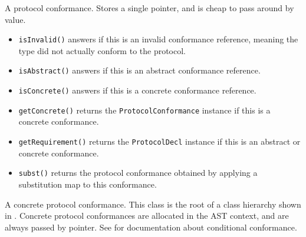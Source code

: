 \documentclass[../generics]{subfiles}
\begin{document}
A protocol conformance. Stores a single pointer, and is cheap to pass around by value.
\begin{itemize}
\item \texttt{isInvalid()} answers if this is an invalid conformance reference, meaning the type did not actually conform to the protocol.
\item \texttt{isAbstract()} answers if this is an abstract conformance reference.
\item \texttt{isConcrete()} answers if this is a concrete conformance reference.
\item \texttt{getConcrete()} returns the \texttt{ProtocolConformance} instance if this is a concrete conformance.
\item \texttt{getRequirement()} returns the \texttt{ProtocolDecl} instance if this is an abstract or concrete conformance.
\item \texttt{subst()} returns the protocol conformance obtained by applying a substitution map to this conformance.
\end{itemize}

A concrete protocol conformance. This class is the root of a class hierarchy shown in . Concrete protocol conformances are allocated in the AST context, and are always passed by pointer. See  for documentation about conditional conformance.

\begin{figure}\label{conformancehierarchy}
\begin{center}
\end{center}
\end{figure}
\end{document}
